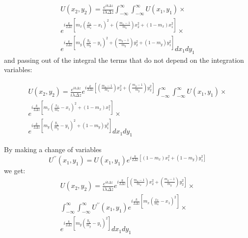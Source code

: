\documentclass{iucr}              %
\begin{document}
\begin{multline} \label{eq: propagation with m factor and no manupulation}
U(x_2, y_2) = \frac {e^{ik\Delta z }}{ i \lambda \Delta z} \int_{-\infty}^{\infty} \int_{-\infty}^{\infty}U(x_1, y_1) \times \\
e^{i \frac{k}{2 \Delta z} [m_x (\frac{x_2}{m_x}-x_1)^2 + (\frac{m_x - 1}{m_x})x_2^2 + (1-m_x)x_1^2]} \times \\
e^{i \frac{k}{2 \Delta z}[m_y (\frac{y_2}{m_y}-y_1)^2 + (\frac{m_y - 1}{m_y})y_2^2 + (1-m_y)y_1^2]} dx_1 dy_1
\end{multline}
and passing out of the integral the terms that do not depend on the integration variables:

\begin{multline}\label{eq: propagation with m factor and manipulation}
U(x_2, y_2) = \frac {e^{ik\Delta z }}{ i \lambda \Delta z} e^{i \frac{k}{2 \Delta z} [(\frac{m_x - 1}{m_x})x_2^2 + (\frac{m_y - 1}{m_y})y_2^2]} 
\int_{-\infty}^{\infty} \int_{-\infty}^{\infty}U(x_1, y_1) \times \\
e^{i \frac{k}{2 \Delta z} [m_x (\frac{x_2}{m_x}-x_1)^2 + (1-m_x)x_1^2]} \times \\
e^{i \frac{k}{2 \Delta z}[m_y (\frac{y_2}{m_y}-y_1)^2 + (1-m_y)y_1^2]} dx_1 dy_1
\end{multline}

By making a change of variables
\begin{equation} \label{eq: substitution of U}
U^{\prime\prime} (x_1, y_1) = U(x_1, y_1) e^{i \frac{k}{2 \Delta z} [(1-m_x)x_1^2 + (1-m_y)y_1^2]}
\end{equation}
we get:
\begin{multline}\label{eq: substitution of U in integral}
U(x_2, y_2) = \frac {e^{ik\Delta z }}{ i \lambda \Delta z} e^{i \frac{k}{2 \Delta z} [(\frac{m_x - 1}{m_x})x_2^2 + (\frac{m_y - 1}{m_y})y_2^2]} \times \\ \int_{-\infty}^{\infty} \int_{-\infty}^{\infty} U^{\prime \prime}(x_1, y_1)
e^{i \frac{k}{2 \Delta z} [m_x (\frac{x_2}{m_x}-x_1)^2]} \times \\
e^{i \frac{k}{2 \Delta z}[m_y (\frac{y_2}{m_y}-y_1)^2]} dx_1 dy_1
\end{multline}
\end{document}
